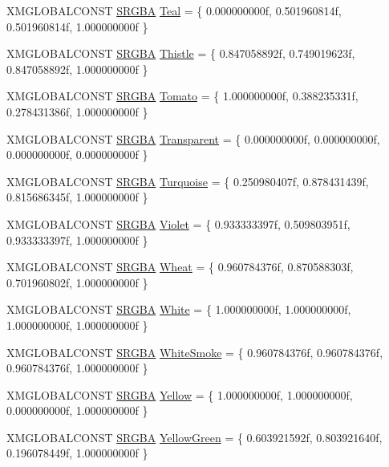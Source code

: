 \begin{DoxyCompactItemize}
\item 
X\+M\+G\+L\+O\+B\+A\+L\+C\+O\+N\+ST \hyperlink{structmage_1_1_s_r_g_b_a}{S\+R\+G\+BA} \hyperlink{namespacemage_1_1color_a5a7a616ec00a38afb3b2c97e22ef555d}{Teal} = \{ 0.\+000000000f, 0.\+501960814f, 0.\+501960814f, 1.\+000000000f \}
\item 
X\+M\+G\+L\+O\+B\+A\+L\+C\+O\+N\+ST \hyperlink{structmage_1_1_s_r_g_b_a}{S\+R\+G\+BA} \hyperlink{namespacemage_1_1color_af0130361545ad1169a81e820fee4c8bf}{Thistle} = \{ 0.\+847058892f, 0.\+749019623f, 0.\+847058892f, 1.\+000000000f \}
\item 
X\+M\+G\+L\+O\+B\+A\+L\+C\+O\+N\+ST \hyperlink{structmage_1_1_s_r_g_b_a}{S\+R\+G\+BA} \hyperlink{namespacemage_1_1color_a1f9596eae4cf47ef70b15c5a0cae26e5}{Tomato} = \{ 1.\+000000000f, 0.\+388235331f, 0.\+278431386f, 1.\+000000000f \}
\item 
X\+M\+G\+L\+O\+B\+A\+L\+C\+O\+N\+ST \hyperlink{structmage_1_1_s_r_g_b_a}{S\+R\+G\+BA} \hyperlink{namespacemage_1_1color_a8f082eed46cfcf7c8c1c8bc206b6e501}{Transparent} = \{ 0.\+000000000f, 0.\+000000000f, 0.\+000000000f, 0.\+000000000f \}
\item 
X\+M\+G\+L\+O\+B\+A\+L\+C\+O\+N\+ST \hyperlink{structmage_1_1_s_r_g_b_a}{S\+R\+G\+BA} \hyperlink{namespacemage_1_1color_afb41a2ea6e693f2db82002ca69ca99a8}{Turquoise} = \{ 0.\+250980407f, 0.\+878431439f, 0.\+815686345f, 1.\+000000000f \}
\item 
X\+M\+G\+L\+O\+B\+A\+L\+C\+O\+N\+ST \hyperlink{structmage_1_1_s_r_g_b_a}{S\+R\+G\+BA} \hyperlink{namespacemage_1_1color_a8bdb9f0215a2545fa3b42d472cb83cc8}{Violet} = \{ 0.\+933333397f, 0.\+509803951f, 0.\+933333397f, 1.\+000000000f \}
\item 
X\+M\+G\+L\+O\+B\+A\+L\+C\+O\+N\+ST \hyperlink{structmage_1_1_s_r_g_b_a}{S\+R\+G\+BA} \hyperlink{namespacemage_1_1color_aaf821b2e2abf8783372e656a91517117}{Wheat} = \{ 0.\+960784376f, 0.\+870588303f, 0.\+701960802f, 1.\+000000000f \}
\item 
X\+M\+G\+L\+O\+B\+A\+L\+C\+O\+N\+ST \hyperlink{structmage_1_1_s_r_g_b_a}{S\+R\+G\+BA} \hyperlink{namespacemage_1_1color_a799c518dd6b5f05e1a75ee06e7ed9651}{White} = \{ 1.\+000000000f, 1.\+000000000f, 1.\+000000000f, 1.\+000000000f \}
\item 
X\+M\+G\+L\+O\+B\+A\+L\+C\+O\+N\+ST \hyperlink{structmage_1_1_s_r_g_b_a}{S\+R\+G\+BA} \hyperlink{namespacemage_1_1color_af06dc9acfb11fea4058a93f0b79bc217}{White\+Smoke} = \{ 0.\+960784376f, 0.\+960784376f, 0.\+960784376f, 1.\+000000000f \}
\item 
X\+M\+G\+L\+O\+B\+A\+L\+C\+O\+N\+ST \hyperlink{structmage_1_1_s_r_g_b_a}{S\+R\+G\+BA} \hyperlink{namespacemage_1_1color_ad57da99577741e2fdcc8d6b01bb784cb}{Yellow} = \{ 1.\+000000000f, 1.\+000000000f, 0.\+000000000f, 1.\+000000000f \}
\item 
X\+M\+G\+L\+O\+B\+A\+L\+C\+O\+N\+ST \hyperlink{structmage_1_1_s_r_g_b_a}{S\+R\+G\+BA} \hyperlink{namespacemage_1_1color_a6d85b53793a5a5cb525a25a3c65490a1}{Yellow\+Green} = \{ 0.\+603921592f, 0.\+803921640f, 0.\+196078449f, 1.\+000000000f \}
\end{DoxyCompactItemize}


